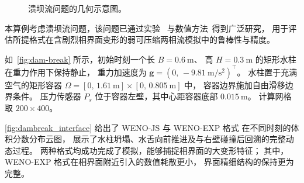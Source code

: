 \documentclass[12pt,a4paper]{article}
\numberwithin{equation}{section}    %
\begin{document}
\begin{figure}[!htbp]
    \centering
    
    \caption{溃坝流问题的几何示意图。}
    \label{fig:dam-break}
\end{figure}

本算例考虑溃坝流问题，该问题已通过实验~\cite{LOBOVSKY2014407,Martin1952PartIA}
与数值方法~\cite{PARAMESWARAN2019405,Yang2020AHF}得到广泛研究，
用于评估所提格式在含剧烈相界面变形的弱可压缩两相流模拟中的鲁棒性与精度。

如~\autoref{fig:dam-break} 所示，初始时刻一个长 $B = 0.6~\mathrm{m}$、
高 $H = 0.3~\mathrm{m}$ 的矩形水柱在重力作用下保持静止，
重力加速度为 $\bm{g} = (0,\,-9.81~\mathrm{m/s^2})^\top$。
水柱置于充满空气的矩形容器
$\Omega = [0,\,1.61~\mathrm{m}] \times [0,\,0.805~\mathrm{m}]$ 中，
容器边界施加自由滑移边界条件。
压力传感器 $P_s$ 位于容器左壁，其中心距容器底部 $0.015~\mathrm{m}$。
计算网格取 $200\times 400$。

\autoref{fig:dambreak_interface} 给出了 WENO-JS 与 WENO-EXP 格式
在不同时刻的体积分数分布云图，
展示了水柱坍塌、水舌向前推进及与右壁碰撞后回溯的完整动态过程。
两种格式均成功完成了模拟，能够捕捉相界面的大变形特征；
其中，WENO-EXP 格式在相界面附近引入的数值耗散更小，
界面精细结构的保持更为完整。
\end{document}
